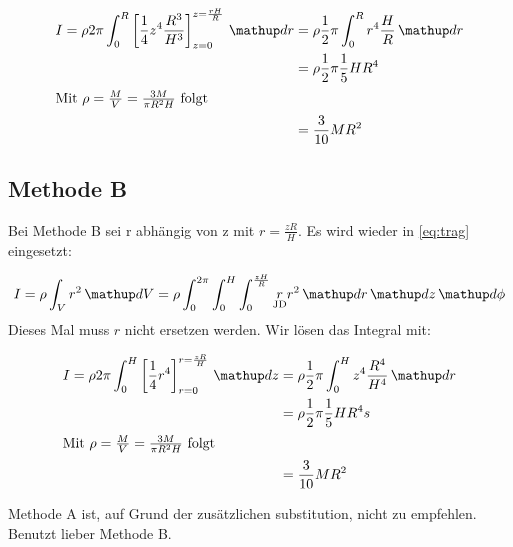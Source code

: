 \begin{align*}
I=\rho 2\pi \int_{0}^{R}\left[\frac{1}{4}z^4\frac{R^3}{H^3}\right]_{z=0}^{z=\frac{rH}{R}}\dv{r}&=\rho \frac{1}{2}\pi \int_{0}^{R} r^4\frac{H}{R}\dv{r}\\
&=\rho \frac{1}{2}\pi \frac{1}{5}H R^4\\
\intertext{Mit $\rho=\frac{M}{V}=\frac{3M}{\pi R^2H}$ folgt}
&=\frac{3}{10}MR^2
\end{align*}

\subsection{Methode B}
Bei Methode B sei r abhängig von z mit $r=\frac{zR}{H}$. 
Es wird wieder in \eqref{eq:trag} eingesetzt:

\begin{equation*}
I=\rho\int_{V} r^2 \dv{V}=\rho \int_{0}^{2\pi}\int_{0}^{H}\int_{0}^{\frac{zH}{R}} \underset{\text{JD}}{r}r^2\dv{r}\dv{z}\dv{\phi}
\end{equation*}
Dieses Mal muss $r$ nicht ersetzen werden.
Wir lösen das Integral mit:

\begin{align*}
I=\rho 2\pi \int_{0}^{H}\left[\frac{1}{4}r^4\right]_{r=0}^{r=\frac{zR}{H}}\dv{z}&=\rho \frac{1}{2}\pi \int_{0}^{H} z^4\frac{R^4}{H^4}\dv{r}\\
&=\rho \frac{1}{2}\pi \frac{1}{5}H R^4s\\
\intertext{Mit $\rho=\frac{M}{V}=\frac{3M}{\pi R^2H}$ folgt}
&=\frac{3}{10}MR^2
\end{align*}

\begin{center}
Methode A ist, auf Grund der zusätzlichen substitution, nicht zu empfehlen.
Benutzt lieber Methode B.
\end{center}